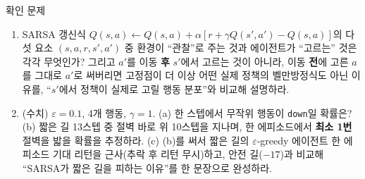 \documentclass[aspectratio=169,11pt]{beamer}
\begin{document}
\begin{frame}{확인 문제}
  \small
  \begin{enumerate}
    \item SARSA 갱신식 $Q(s,a) \leftarrow Q(s,a) + \alpha[r +
      \gamma Q(s',a') - Q(s,a)]$의 다섯 요소 $(s,a,r,s',a')$ 중
      환경이 ``관찰''로 주는 것과 에이전트가 ``고르는'' 것은 각각
      무엇인가? 그리고 $a'$를 이동 \textbf{후} $s'$에서 고르는 것이
      아니라, 이동 \textbf{전}에 고른 $a$를 그대로 $a'$로 써버리면
      고정점이 더 이상 어떤 실제 정책의 벨만방정식도 아닌 이유를,
      ``$s'$에서 정책이 실제로 고릴 행동 분포''와 비교해 설명하라.
    \item (수치) $\varepsilon=0.1$, 4개 행동, $\gamma=1$.
      (a) 한 스텝에서 무작위 행동이 \texttt{down}일 확률은?
      (b) 짧은 길 13스텝 중 절벽 바로 위 10스텝을 지나며, 한 에피소드에서
      \textbf{최소 1번} 절벽을 밟을 확률을 추정하라.
      (c) (b)를 써서 짧은 길의 $\varepsilon$-greedy 에이전트 한 에피소드
      기대 리턴을 근사(추락 후 리턴 무시)하고, 안전 길($-17$)과 비교해
      ``SARSA가 짧은 길을 피하는 이유''를 한 문장으로 완성하라.
  \end{enumerate}
\end{frame}

\end{document}

